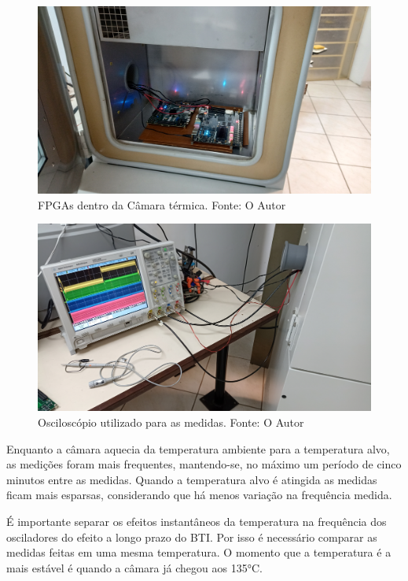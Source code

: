 \begin{figure}[H]
    \centering
    \includegraphics[scale=0.08]{figures/Metodologia/Ensaios_FpgasNoForno.jpg}
    \caption{FPGAs dentro da Câmara térmica. Fonte: O Autor}
    \label{fig:CamTerm}
\end{figure}

\begin{figure}[H]
    \centering
    \includegraphics[scale=0.08]{figures/Metodologia/Ensaios_Osciloscopio.jpg}
    \caption{Osciloscópio utilizado para as medidas. Fonte: O Autor}
    \label{fig:Osciloscopio}
\end{figure}

Enquanto a câmara aquecia da temperatura ambiente para a temperatura alvo, as medições foram mais frequentes, mantendo-se, no máximo um período de cinco minutos entre as medidas. Quando a temperatura alvo é atingida as medidas ficam mais esparsas, considerando que há menos variação na frequência medida.

É importante separar os efeitos instantâneos da temperatura na frequência dos osciladores do efeito a longo prazo do BTI. Por isso é necessário comparar as medidas feitas em uma mesma temperatura. O momento que a temperatura é a mais estável é quando a câmara já chegou aos 135°C.

